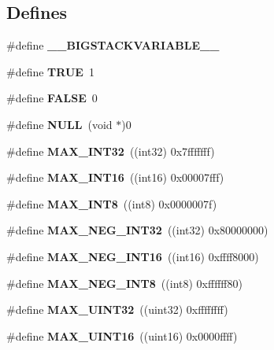 \subsection*{\-Defines}
\begin{DoxyCompactItemize}
\item 
\#define {\bfseries \-\_\-\-\_\-\-B\-I\-G\-S\-T\-A\-C\-K\-V\-A\-R\-I\-A\-B\-L\-E\-\_\-\-\_\-}\label{prim__type_8h_a64d603953ff96570ac4072daaeaeb36b}

\item 
\#define {\bfseries \-T\-R\-U\-E}~1\label{prim__type_8h_aa8cecfc5c5c054d2875c03e77b7be15d}

\item 
\#define {\bfseries \-F\-A\-L\-S\-E}~0\label{prim__type_8h_aa93f0eb578d23995850d61f7d61c55c1}

\item 
\#define {\bfseries \-N\-U\-L\-L}~(void $\ast$)0\label{prim__type_8h_a070d2ce7b6bb7e5c05602aa8c308d0c4}

\item 
\#define {\bfseries \-M\-A\-X\-\_\-\-I\-N\-T32}~((int32) 0x7fffffff)\label{prim__type_8h_aac62d87844689a18b6f5339a89ed6e7f}

\item 
\#define {\bfseries \-M\-A\-X\-\_\-\-I\-N\-T16}~((int16) 0x00007fff)\label{prim__type_8h_a3905e54374e49708219791e7d59c60fb}

\item 
\#define {\bfseries \-M\-A\-X\-\_\-\-I\-N\-T8}~((int8)  0x0000007f)\label{prim__type_8h_aa092b7d509790c28edc065b23de6e39e}

\item 
\#define {\bfseries \-M\-A\-X\-\_\-\-N\-E\-G\-\_\-\-I\-N\-T32}~((int32) 0x80000000)\label{prim__type_8h_a29962133c3b9c5c2cf72f7d9299fd4a0}

\item 
\#define {\bfseries \-M\-A\-X\-\_\-\-N\-E\-G\-\_\-\-I\-N\-T16}~((int16) 0xffff8000)\label{prim__type_8h_a4338527c828e68762d8b40e01f0e0869}

\item 
\#define {\bfseries \-M\-A\-X\-\_\-\-N\-E\-G\-\_\-\-I\-N\-T8}~((int8)  0xffffff80)\label{prim__type_8h_a76a3e608c93aff0ad98b3b742c51d38f}

\item 
\#define {\bfseries \-M\-A\-X\-\_\-\-U\-I\-N\-T32}~((uint32) 0xffffffff)\label{prim__type_8h_a26248174abf27973b9edfa9b70ba4c93}

\item 
\#define {\bfseries \-M\-A\-X\-\_\-\-U\-I\-N\-T16}~((uint16) 0x0000ffff)\label{prim__type_8h_abc023544d8096a8fa1bd1f6f6f90bc41}


\end{DoxyCompactItemize}
